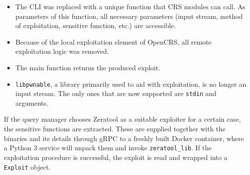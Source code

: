 \documentclass[../main.tex]{subfiles}
\begin{document}
\begin{itemize}
  \tightlist
  \item
        The CLI was replaced with a unique function that CRS modules can call.
        As parameters of this function, all necessary parameters (input
        stream, method of exploitation, sensitive function, etc.) are
        accessible.
  \item
        Because of the local exploitation element of OpenCRS, all remote
        exploitation logic was removed.
  \item
        The main function returns the produced exploit.
  \item
        \texttt{libpwnable}, a library primarily used to aid with
        exploitation, is no longer an input stream. The only ones that are now
        supported are \texttt{stdin} and arguments.
\end{itemize}

If the query manager chooses Zeratool as a suitable exploiter for a certain
case, the sensitive functions are extracted. These are supplied together with
the binaries and its details through gRPC to a freshly built Docker container,
where a Python 3 service will unpack them and invoke \texttt{zeratool\_lib}. If
the exploitation procedure is successful, the exploit is read and wrapped into
a \texttt{Exploit} object.
\end{document}
